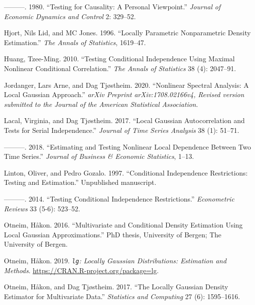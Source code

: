 \documentclass[
  12pt,
  letterpaper]{article}
\newlength{\cslhangindent}
\newenvironment{cslreferences}%
  {\setlength{\parindent}{0pt}%
  \everypar{\setlength{\hangindent}{\cslhangindent}}\ignorespaces}%
  {\par}
\theoremstyle{definition}
\theoremstyle{definition}
\theoremstyle{definition}
\theoremstyle{remark}
\begin{document}
\begin{cslreferences}
\leavevmode\hypertarget{ref-granger1980testing}{}%
---------. 1980. ``Testing for Causality: A Personal Viewpoint.'' \emph{Journal of Economic Dynamics and Control} 2: 329--52.

\leavevmode\hypertarget{ref-hjort1996locally}{}%
Hjort, Nils Lid, and MC Jones. 1996. ``Locally Parametric Nonparametric Density Estimation.'' \emph{The Annals of Statistics}, 1619--47.

\leavevmode\hypertarget{ref-huang2010testing}{}%
Huang, Tzee-Ming. 2010. ``Testing Conditional Independence Using Maximal Nonlinear Conditional Correlation.'' \emph{The Annals of Statistics} 38 (4): 2047--91.

\leavevmode\hypertarget{ref-jordanger2017nonlinear}{}%
Jordanger, Lars Arne, and Dag Tjøstheim. 2020. ``Nonlinear Spectral Analysis: A Local Gaussian Approach.'' \emph{arXiv Preprint arXiv:1708.02166v4, Revised version submitted to the Journal of the American Statistical Association}.

\leavevmode\hypertarget{ref-lacal2017local}{}%
Lacal, Virginia, and Dag Tjøstheim. 2017. ``Local Gaussian Autocorrelation and Tests for Serial Independence.'' \emph{Journal of Time Series Analysis} 38 (1): 51--71.

\leavevmode\hypertarget{ref-lacal2018estimating}{}%
---------. 2018. ``Estimating and Testing Nonlinear Local Dependence Between Two Time Series.'' \emph{Journal of Business \& Economic Statistics}, 1--13.

\leavevmode\hypertarget{ref-linton1997conditional}{}%
Linton, Oliver, and Pedro Gozalo. 1997. ``Conditional Independence Restrictions: Testing and Estimation.'' Unpublished manuscript.

\leavevmode\hypertarget{ref-linton2014testing}{}%
---------. 2014. ``Testing Conditional Independence Restrictions.'' \emph{Econometric Reviews} 33 (5-6): 523--52.

\leavevmode\hypertarget{ref-otneim2016multivariate}{}%
Otneim, Håkon. 2016. ``Multivariate and Conditional Density Estimation Using Local Gaussian Approximations.'' PhD thesis, University of Bergen; The University of Bergen.

\leavevmode\hypertarget{ref-otneim2019lg}{}%
Otneim, Håkon. 2019. \emph{\texttt{lg}: Locally Gaussian Distributions: Estimation and Methods}. \url{https://CRAN.R-project.org/package=lg}.

\leavevmode\hypertarget{ref-otneim2017locally}{}%
Otneim, Håkon, and Dag Tjøstheim. 2017. ``The Locally Gaussian Density Estimator for Multivariate Data.'' \emph{Statistics and Computing} 27 (6): 1595--1616.


\end{cslreferences}
\end{document}
